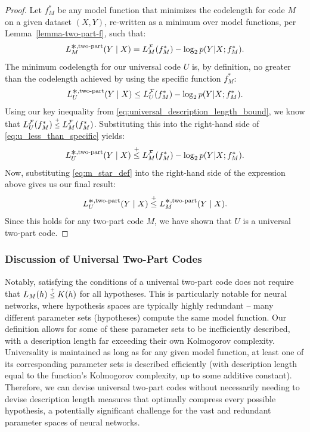 \begin{proof}
Let $f_M^\ast$ be any model function that minimizes the codelength for code $M$ on a given dataset $(X,Y)$, re-written as a minimum over model functions, per Lemma~\ref{lemma-two-part-f}, such that:
\begin{equation}
    L^{\bigast,\text{two-part}}_{M}(Y \mid X) = L_M^\gF(f_M^\ast) - \log_2 p(Y|X;f_M^\ast). \label{eq:m_star_def}
\end{equation}
The minimum codelength for our universal code $U$ is, by definition, no greater than the codelength achieved by using the specific function $f_M^\ast$:
\begin{equation}
    L^{\bigast,\text{two-part}}_{U}(Y \mid X) \leq L_U^\gF(f_M^\ast) - \log_2 p(Y|X;f_M^\ast). \label{eq:u_less_than_specific}
\end{equation}
Using our key inequality from \eqref{eq:universal_description_length_bound}, we know that $L_U^\gF(f_M^\ast) \leqc L_M^\gF(f_M^\ast)$. Substituting this into the right-hand side of \eqref{eq:u_less_than_specific} yields:
\begin{equation*}
L^{\bigast,\text{two-part}}_{U}(Y \mid X) \leqc L_M^\gF(f_M^\ast) - \log_2 p(Y|X;f_M^\ast).
\end{equation*}
Now, substituting \eqref{eq:m_star_def} into the right-hand side of the expression above gives us our final result:
\begin{equation}
L^{\bigast,\text{two-part}}_{U}(Y \mid X) \leqc L^{\bigast,\text{two-part}}_{M}(Y \mid X).
\end{equation}
Since this holds for any two-part code $M$, we have shown that $U$ is a universal two-part code.
\end{proof}


\subsubsection{Discussion of Universal Two-Part Codes}
\label{sec:universal-two-part-code-discussion}

  Notably, satisfying the conditions of a universal two-part code does not require that $L_M(h) \leqc K(h)$ for all hypotheses. This is particularly notable for neural networks, where hypothesis spaces are typically highly redundant -- many different parameter sets (hypotheses) compute the same model function. Our definition allows for some of these parameter sets to be inefficiently described, with a description length far exceeding their own Kolmogorov complexity. Universality is maintained as long as for any given model function, at least one of its corresponding parameter sets is described efficiently (with description length equal to the function's Kolmogorov complexity, up to some additive constant). Therefore, we can devise universal two-part codes without necessarily needing to devise description length measures that optimally compress every possible hypothesis, a potentially significant challenge for the vast and redundant parameter spaces of neural networks.
 
